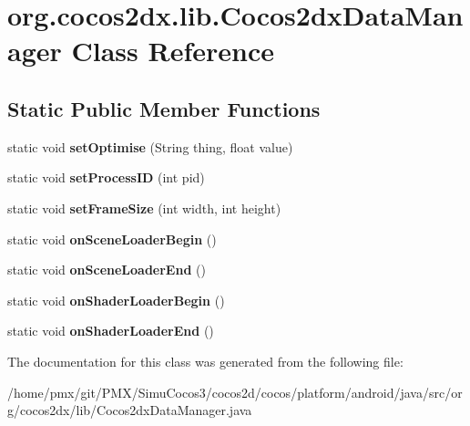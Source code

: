 \hypertarget{classorg_1_1cocos2dx_1_1lib_1_1Cocos2dxDataManager}{}\section{org.\+cocos2dx.\+lib.\+Cocos2dx\+Data\+Manager Class Reference}
\label{classorg_1_1cocos2dx_1_1lib_1_1Cocos2dxDataManager}
\subsection*{Static Public Member Functions}
\begin{DoxyCompactItemize}
\item 
\mbox{\label{classorg_1_1cocos2dx_1_1lib_1_1Cocos2dxDataManager_a80e3313d6fc001f54a03f8e3c8b5d824}} 
static void {\bfseries set\+Optimise} (String thing, float value)
\item 
\mbox{\label{classorg_1_1cocos2dx_1_1lib_1_1Cocos2dxDataManager_a7d457fad763596bfb504f7ef106e57ac}} 
static void {\bfseries set\+Process\+ID} (int pid)
\item 
\mbox{\label{classorg_1_1cocos2dx_1_1lib_1_1Cocos2dxDataManager_a9aee5b01ee9931ada0d9ca36b3af33ea}} 
static void {\bfseries set\+Frame\+Size} (int width, int height)
\item 
\mbox{\label{classorg_1_1cocos2dx_1_1lib_1_1Cocos2dxDataManager_aea31d4bfb53ef519e0ac3656af00308f}} 
static void {\bfseries on\+Scene\+Loader\+Begin} ()
\item 
\mbox{\label{classorg_1_1cocos2dx_1_1lib_1_1Cocos2dxDataManager_a7462075a200aa448a02a51cba8058cc6}} 
static void {\bfseries on\+Scene\+Loader\+End} ()
\item 
\mbox{\label{classorg_1_1cocos2dx_1_1lib_1_1Cocos2dxDataManager_ae21ea905df55d0c9acd9ad3a629cb4a6}} 
static void {\bfseries on\+Shader\+Loader\+Begin} ()
\item 
\mbox{\label{classorg_1_1cocos2dx_1_1lib_1_1Cocos2dxDataManager_ad472e44caeb47dbb13d461891d94af1d}} 
static void {\bfseries on\+Shader\+Loader\+End} ()
\end{DoxyCompactItemize}


The documentation for this class was generated from the following file\+:\begin{DoxyCompactItemize}
\item 
/home/pmx/git/\+P\+M\+X/\+Simu\+Cocos3/cocos2d/cocos/platform/android/java/src/org/cocos2dx/lib/Cocos2dx\+Data\+Manager.\+java\end{DoxyCompactItemize}
